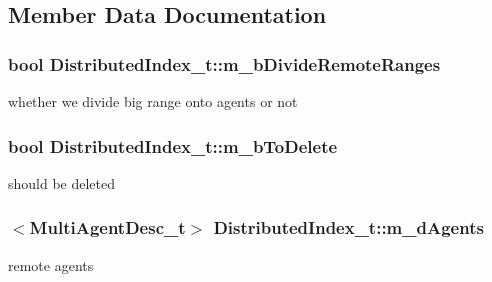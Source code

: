 \subsection{Member Data Documentation}
\hypertarget{structDistributedIndex__t_a1aaf61c935c3e71b18f229b02e7e00a4}{
\subsubsection[{m\-\_\-b\-Divide\-Remote\-Ranges}]{\setlength{\rightskip}{0pt plus 5cm}bool Distributed\-Index\-\_\-t\-::m\-\_\-b\-Divide\-Remote\-Ranges}}\label{structDistributedIndex__t_a1aaf61c935c3e71b18f229b02e7e00a4}


whether we divide big range onto agents or not 

\hypertarget{structDistributedIndex__t_a5cc105eb8b94891003cbf95a81ea19cb}{
\subsubsection[{m\-\_\-b\-To\-Delete}]{\setlength{\rightskip}{0pt plus 5cm}bool Distributed\-Index\-\_\-t\-::m\-\_\-b\-To\-Delete}}\label{structDistributedIndex__t_a5cc105eb8b94891003cbf95a81ea19cb}


should be deleted 

\hypertarget{structDistributedIndex__t_a30d42315163c40fe2effe82d5a746e02}{
\subsubsection[{m\-\_\-d\-Agents}]{$<${\bf Multi\-Agent\-Desc\-\_\-t}$>$ Distributed\-Index\-\_\-t\-::m\-\_\-d\-Agents}}\label{structDistributedIndex__t_a30d42315163c40fe2effe82d5a746e02}


remote agents 

